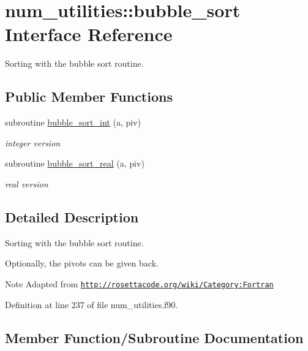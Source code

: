 \hypertarget{interfacenum__utilities_1_1bubble__sort}{}\section{num\+\_\+utilities\+:\+:bubble\+\_\+sort Interface Reference}
\label{interfacenum__utilities_1_1bubble__sort}


Sorting with the bubble sort routine.  


\subsection*{Public Member Functions}
\begin{DoxyCompactItemize}
\item 
subroutine \hyperlink{interfacenum__utilities_1_1bubble__sort_a74f1fe19abea32a3b14885d95c21f8e5}{bubble\+\_\+sort\+\_\+int} (a, piv)
\begin{DoxyCompactList}\small\item\em integer version \end{DoxyCompactList}\item 
subroutine \hyperlink{interfacenum__utilities_1_1bubble__sort_a3aab7865ebc07b9fa200ca574d15819f}{bubble\+\_\+sort\+\_\+real} (a, piv)
\begin{DoxyCompactList}\small\item\em real version \end{DoxyCompactList}\end{DoxyCompactItemize}


\subsection{Detailed Description}
Sorting with the bubble sort routine. 

Optionally, the pivots can be given back.

\begin{DoxyNote}{Note}
Adapted from \href{http://rosettacode.org/wiki/Category:Fortran}{\tt http\+://rosettacode.\+org/wiki/\+Category\+:\+Fortran} 
\end{DoxyNote}


Definition at line 237 of file num\+\_\+utilities.\+f90.



\subsection{Member Function/\+Subroutine Documentation}
\mbox{\label{interfacenum__utilities_1_1bubble__sort_a74f1fe19abea32a3b14885d95c21f8e5}} 
